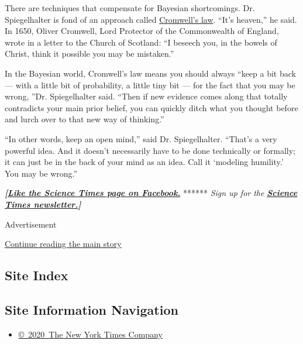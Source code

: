 There are techniques that compensate for Bayesian shortcomings. Dr.
Spiegelhalter is fond of an approach called
\href{https://understandinguncertainty.org/node/97}{Cromwell's law}.
``It's heaven,'' he said. In 1650, Oliver Cromwell, Lord Protector of
the Commonwealth of England, wrote in a letter to the Church of
Scotland: ``I beseech you, in the bowels of Christ, think it possible
you may be mistaken.''

In the Bayesian world, Cromwell's law means you should always ``keep a
bit back --- with a little bit of probability, a little tiny bit --- for
the fact that you may be wrong, ''Dr. Spiegelhalter said. ``Then if new
evidence comes along that totally contradicts your main prior belief,
you can quickly ditch what you thought before and lurch over to that new
way of thinking.''

``In other words, keep an open mind,'' said Dr. Spiegelhalter. ``That's
a very powerful idea. And it doesn't necessarily have to be done
technically or formally; it can just be in the back of your mind as an
idea. Call it `modeling humility.' You may be wrong.''

\textbf{\emph{{[}}\href{http://on.fb.me/1paTQ1h}{\emph{Like the Science
Times page on Facebook.}}} ****** \emph{\textbar{} Sign up for the}
\textbf{\href{http://nyti.ms/1MbHaRU}{\emph{Science Times
newsletter.}}\emph{{]}}}

Advertisement

\protect\hyperlink{after-bottom}{Continue reading the main story}

\hypertarget{site-index}{%
\subsection{Site Index}\label{site-index}}

\hypertarget{site-information-navigation}{%
\subsection{Site Information
Navigation}\label{site-information-navigation}}

\begin{itemize}
\tightlist
\item
  \href{https://help.nytimes.com/hc/en-us/articles/115014792127-Copyright-notice}{©~2020~The
  New York Times Company}
\end{itemize}

